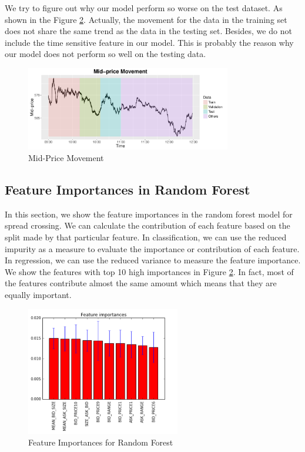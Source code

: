 \documentclass[11pt]{article}
\begin{document}
We try to figure out why our model perform so worse on the test dataset. As shown in the Figure \ref{figure3}. Actually, the movement for the data in the training set does not share the same trend as the data in the testing set. Besides, we do not include the time sensitive feature in our model. This is probably the reason why our model does not perform so well on the testing data.

\begin{figure}
  \centering
    \includegraphics[width=0.8\textwidth]{Figures/Midprice}
  \caption{Mid-Price Movement}
  \label{figure2}
\end{figure}


\subsection{Feature Importances in Random Forest}
In this section, we show the feature importances in the random forest model for spread crossing. We can calculate the contribution of each feature based on the split made by that particular feature. In classification, we can use the reduced impurity as a measure to evaluate the importance or contribution of each feature. In regression, we can use the reduced variance to measure the feature importance. We show the features with top 10 high importances in Figure \ref{figure3}. In fact, most of the features contribute almost the same amount which means that they are equally important.

\begin{figure}
  \centering
    \includegraphics[width=0.6\textwidth]{Figures/importance}
  \caption{Feature Importances for Random Forest}
  \label{figure3}
\end{figure}
\end{document}
